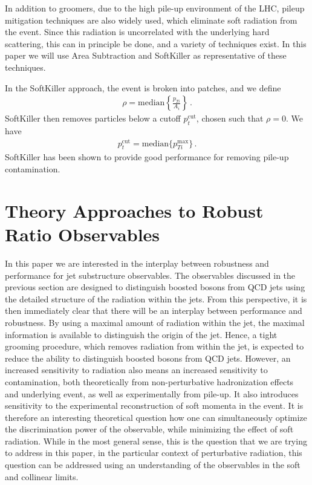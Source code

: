 \documentclass[11pt,letterpaper]{article}
\begin{document}
In addition to groomers, due to the high pile-up environment of the LHC, pileup mitigation techniques \cite{Cacciari:2007fd,Alon:2011xb,Soyez:2012hv,Tseng:2013dva,Krohn:2013lba,Cacciari:2014gra,Bertolini:2014bba} are also widely used, which eliminate soft radiation from the event. Since this radiation is uncorrelated with the underlying hard scattering, this can in principle be done, and a variety of techniques exist.  In this paper we will use Area Subtraction \cite{Cacciari:2007fd,Cacciari:2008gn} and SoftKiller \cite{Cacciari:2014gra} as representative of these techniques.

In the SoftKiller approach, the event is broken into patches, and we define
\begin{align}
\rho= \text{median} \left \{ \frac{p_{Ti}}{A_i}   \right \}\,.
\end{align}
SoftKiller then removes particles below a cutoff $p_t^{\text{cut}}$, chosen such that $\rho=0$. We have
\begin{align}
p_t^{\text{cut}}=\text{median} \{ p_{Ti}^{\text{max}} \}\,.
\end{align}
SoftKiller has been shown to provide good performance for removing pile-up contamination.



\section{Theory Approaches to Robust Ratio Observables}\label{sec:hybrid_ratio}









In this paper we are interested in the interplay between robustness and performance for jet substructure observables. The observables discussed in the previous section are designed to distinguish boosted bosons from QCD jets using the detailed structure of the radiation within the jets. From this perspective, it is then immediately clear that there will be an interplay between performance and robustness. By using a maximal amount of radiation within the jet, the maximal information is available to distinguish the origin of the jet. Hence, a tight grooming procedure, which removes radiation from within the jet, is expected to reduce the ability to distinguish boosted bosons from QCD jets. However, an increased sensitivity to radiation also means an increased sensitivity to contamination, both theoretically from non-perturbative hadronization effects and underlying event, as well as experimentally from pile-up. It also introduces sensitivity to the experimental reconstruction of soft momenta in the event. It is therefore an interesting theoretical question how one can simultaneously optimize the discrimination power of the observable, while minimizing the effect of soft radiation. While in the most general sense, this is the question that we are trying to address in this paper, in the particular context of perturbative radiation, this question can be addressed using an understanding of the observables in the soft and collinear limits. 
\end{document}
